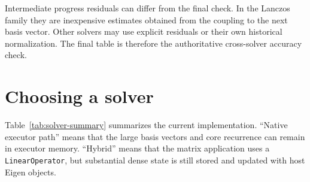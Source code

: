 \documentclass[11pt]{article}
\newcommand{\code}[1]{\texttt{#1}}
\begin{document}
Intermediate progress residuals can differ from the final check.  In the
Lanczos family they are inexpensive estimates obtained from the coupling to the
next basis vector.  Other solvers may use explicit residuals or their own
historical normalization.  The final table is therefore the authoritative
cross-solver accuracy check.

\section{Choosing a solver}
\label{sec:selection}

Table~\ref{tab:solver-summary} summarizes the current implementation.  ``Native
executor path'' means that the large basis vectors and core recurrence can
remain in executor memory.  ``Hybrid'' means that the matrix application uses a
\code{LinearOperator}, but substantial dense state is still stored and updated
with host Eigen objects.
\end{document}
